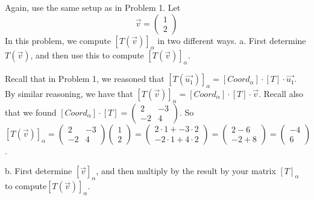 \documentclass[12pt]{article}
\newenvironment{problem}[2][Problem]
{
	\begin{trivlist} 
		\item[\hskip \labelsep {\bfseries #1 #2:}]
	}
{
	\end{trivlist}
	}
\newenvironment{solution}[1][Solution]
{
	\begin{trivlist} 
		\item[\hskip \labelsep {\itshape #1:}]
	}
	{
	\end{trivlist}
}
\begin{document}
\newpage
\begin{problem}{3}
Again, use the same setup as in Problem 1. Let
\[
\vec{v}=\begin{pmatrix}1\\2\end{pmatrix}
\]
In this problem, we compute  $[T(\vec{v})]_{\alpha}$ in two different ways.
\noindent
\newline
\newline
a. First determine $T(\vec{v})$, and then use this to compute $[T(\vec{v})]_{\alpha}$.
\begin{solution}
Recall that in Problem 1, we reasoned that $[T(\vec{u_{1}})]_{\alpha} =  [Coord_{\alpha}]\cdot [T] \cdot \vec{u_{1}}$. By similar reasoning, we have that $[T(\vec{v})]_{\alpha} =  [Coord_{\alpha}]\cdot [T] \cdot \vec{v}$. Recall also that we found $[Coord_{\alpha}]\cdot [T] = \begin{pmatrix} 2 & -3 \\-2 & 4 \end{pmatrix}$. So $[T(\vec{v})]_{\alpha} =\begin{pmatrix} 2 & -3 \\-2 & 4 \end{pmatrix} \begin{pmatrix}1\\2\end{pmatrix} = \begin{pmatrix} 2\cdot 1 + -3 \cdot 2 \\ -2 \cdot 1 + 4\cdot 2 \end{pmatrix} = \begin{pmatrix} 2-6 \\ -2+8 \end{pmatrix} = \begin{pmatrix} -4 \\ 6 \end{pmatrix}$.
\end{solution}
\noindent
\newline
\newline
b. First determine $[\vec{v}]_{\alpha}$, and then multiply by the result by your matrix $[T]_{\alpha}$ to compute$[T(\vec{v})]_{\alpha}$.
\begin{solution}

\end{solution}
\end{problem}
\end{document}
